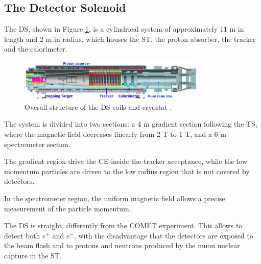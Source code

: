 \subsection{The Detector Solenoid}\label{detectorsolenoid}
The DS, shown in Figure \ref{fig:DS}, is a cylindrical system of approximately 11 m in 
length and 2 m in radius, which houses the ST, 
the proton absorber, the tracker and the calorimeter. 
\begin{figure}[!h]
    \centering
    \includegraphics[width =0.8\textwidth]{figures/png/Screenshot_20240306_225639.png}
    \caption[The structure of the Detector Solenoid coils and cryostat.]{Overall structure of the DS coils and cryostat \cite{bobbb}.}
    \label{fig:DS}
    \end{figure}
The system is divided into two sections: a 4 m gradient section following the TS, 
where the magnetic field decreases linearly from 2 T to 1 T, and a 6 
m spectrometer section. 

The gradient region drive the CE 
inside the tracker acceptance, while the low momentum particles 
are driven to the low radius region that is not covered by detectors.  

In the spectrometer region, the uniform magnetic field allows a precise 
measurement of the particle momentum. 

The DS is straight, differently from the COMET experiment. This allows 
to detect both $e^+$ and $e^-$, with the disadvantage that the detectors are exposed to the 
beam flash and to protons and neutrons produced by the muon
nuclear capture in the ST.


